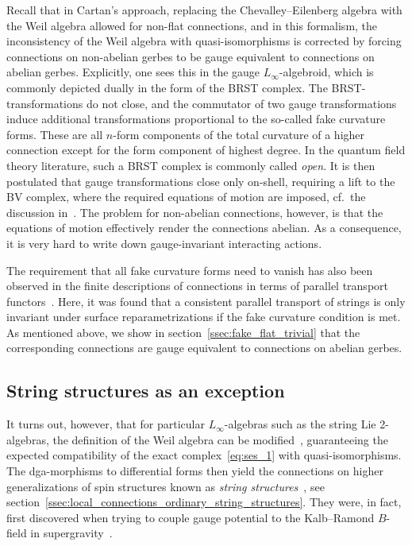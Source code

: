 \documentclass[reqno,a4paper,11pt]{article}
\begin{document}
Recall that in Cartan's approach, replacing the Chevalley--Eilenberg algebra with the Weil algebra allowed for non-flat connections, and in this formalism, the inconsistency of the Weil algebra with quasi-isomorphisms is corrected by forcing connections on non-abelian gerbes to be gauge equivalent to connections on abelian gerbes. Explicitly, one sees this in the gauge $L_\infty$-algebroid, which is commonly depicted dually in the form of the BRST complex. The BRST-transformations do not close, and the commutator of two gauge transformations induce additional transformations proportional to the so-called fake curvature forms. These are all $n$-form components of the total curvature of a higher connection except for the form component of highest degree. In the quantum field theory literature, such a BRST complex is commonly called {\em open}. It is then postulated that gauge transformations close only on-shell, requiring a lift to the BV complex, where the required equations of motion are imposed, cf.~the discussion in~\cite{Jurco:2018sby}. The problem for non-abelian connections, however, is that the equations of motion effectively render the connections abelian. As a consequence, it is very hard to write down gauge-invariant interacting actions.

The requirement that all fake curvature forms need to vanish has also been observed in the finite descriptions of connections in terms of parallel transport functors~\cite{Baez:2004in,Baez:0511710}. Here, it was found that a consistent parallel transport of strings is only invariant under surface reparametrizations if the fake curvature condition is met. As mentioned above, we show in section~\ref{ssec:fake_flat_trivial} that the corresponding connections are gauge equivalent to connections on abelian gerbes.

\subsection{String structures as an exception}

It turns out, however, that for particular $L_\infty$-algebras such as the string Lie 2-algebras, the definition of the Weil algebra can be modified~\cite{Sati:2008eg}, guaranteeing the expected compatibility of the exact complex~\eqref{eq:ses_1} with quasi-isomorphisms. The dga-morphisms to differential forms then yield the connections on higher generalizations of spin structures known as {\em string structures}~\cite{Killingback:1986rd,Witten:1987cg}, see section~\ref{ssec:local_connections_ordinary_string_structures}. They were, in fact, first discovered when trying to couple gauge potential to the Kalb--Ramond $B$-field in supergravity~\cite{Bergshoeff:1981um,Chapline:1982ww}. 
\end{document}
